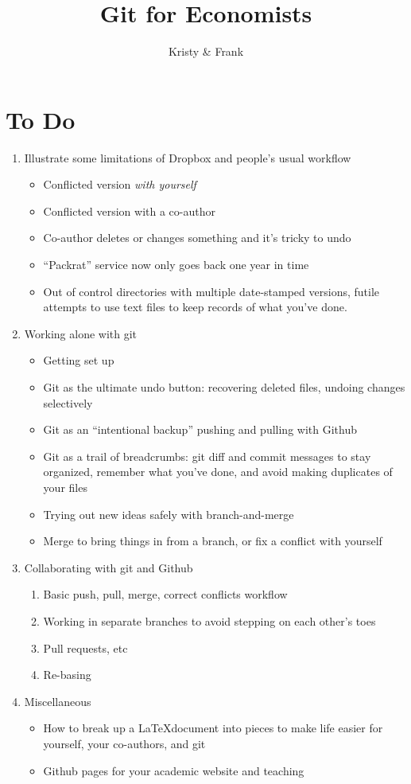 \documentclass[12pt,letterpaper]{article}
\title{Git for Economists}
\author{Kristy \& Frank}
\begin{document}
\maketitle

\section*{To Do}
\begin{enumerate}
	\item Illustrate some limitations of Dropbox and people's usual workflow
		\begin{itemize}
			\item Conflicted version \emph{with yourself}
			\item Conflicted version with a co-author
			\item Co-author deletes or changes something and it's tricky to undo
			\item ``Packrat'' service now only goes back one year in time
			\item Out of control directories with multiple date-stamped versions, futile attempts to use text files to keep records of what you've done.
		\end{itemize}
	\item Working alone with git
		\begin{itemize}
			\item Getting set up
			\item Git as the ultimate undo button: recovering deleted files, undoing changes selectively
			\item Git as an ``intentional backup'' pushing and pulling with Github
			\item Git as a trail of breadcrumbs: git diff and commit messages to stay organized, remember what you've done, and avoid making duplicates of your files
			\item Trying out new ideas safely with branch-and-merge 
			\item Merge to bring things in from a branch, or fix a conflict with yourself
		\end{itemize}
	\item Collaborating with git and Github
		\begin{enumerate}
			\item Basic push, pull, merge, correct conflicts workflow
			\item Working in separate branches to avoid stepping on each other's toes
			\item Pull requests, etc 
			\item Re-basing
		\end{enumerate}
	\item Miscellaneous
		\begin{itemize}
			\item How to break up a \LaTeX document into pieces to make life easier for yourself, your co-authors, and git
			\item Github pages for your academic website and teaching
		\end{itemize}
\end{enumerate}
	
\end{document}
